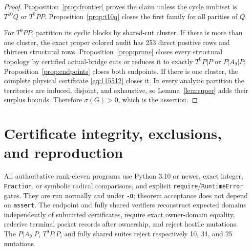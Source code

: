 \documentclass[11pt]{article}
\theoremstyle{remark}
\newcommand{\sig}{\sigma}
\begin{document}
\begin{proof}
Proposition~\ref{prop:frontier} proves the claim unless the cycle multiset is
$T^{10}Q$ or $T^9PP$.  Proposition~\ref{prop:t10q} closes the first family for
all parities of $Q$.

For $T^9PP$, partition its cyclic blocks by shared-cut cluster.  If there is
more than one cluster, the exact proper colored audit has 253 direct positive
rows and thirteen structural rows.  Proposition~\ref{prop:prune} closes every
structural topology by certified actual-bridge cuts or reduces it to exactly
$T^9P|P$ or $P|A_9|P$; Proposition~\ref{prop:endpoints} closes both endpoints.
If there is one cluster, the complete physical certificate
\eqref{eq:115512} closes it.  In every analytic partition the territories are
induced, disjoint, and exhaustive, so Lemma~\ref{lem:super} adds their surplus
bounds.  Therefore $\sig(G)>0$, which is the assertion.
\end{proof}

\section{Certificate integrity, exclusions, and reproduction}

All authoritative rank-eleven programs use Python 3.10 or newer, exact integer,
\texttt{Fraction}, or symbolic radical comparisons, and explicit
\texttt{require}/\texttt{RuntimeError} gates.  They are run normally and under
\texttt{-O}; theorem acceptance does not depend on \texttt{assert}.  The
endpoint and fully shared verifiers reconstruct expected domains independently
of submitted certificates, require exact owner-domain equality, rederive
terminal packet records after ownership, and reject hostile mutations.  The
$P|A_9|P$, $T^9P|P$, and fully shared suites reject respectively 10, 31, and 25
mutations.
\end{document}
